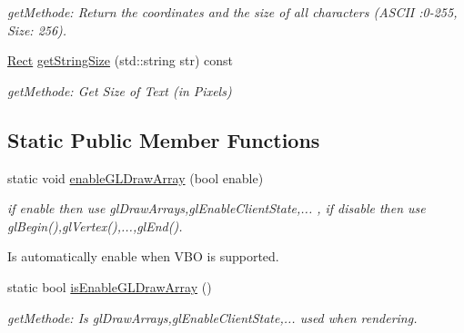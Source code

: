 \begin{DoxyCompactItemize}
\begin{DoxyCompactList}\small\item\em getMethode: Return the coordinates and the size of all characters (ASCII :0-\/255, Size: 256). \item\end{DoxyCompactList}\item 
\hyperlink{class_f2_c_1_1_rect}{Rect} \hyperlink{class_f2_c_1_1_font_sprite_af1955ebf33a251df746d2788dbf6a1d3}{getStringSize} (std::string str) const 
\begin{DoxyCompactList}\small\item\em getMethode: Get Size of Text (in Pixels) \item\end{DoxyCompactList}\end{DoxyCompactItemize}
\subsection*{Static Public Member Functions}
\begin{DoxyCompactItemize}
\item 
static void \hyperlink{class_f2_c_1_1_font_sprite_a6bfad10a42bad52511094add228ae235}{enableGLDrawArray} (bool enable)
\begin{DoxyCompactList}\small\item\em if enable then use glDrawArrays,glEnableClientState,... , if disable then use glBegin(),glVertex(),...,glEnd(). \par
 Is automatically enable when VBO is supported. \item\end{DoxyCompactList}\item 
\hypertarget{class_f2_c_1_1_font_sprite_a59dbe165faa3ebe5f6e565a88095ad82}{
static bool \hyperlink{class_f2_c_1_1_font_sprite_a59dbe165faa3ebe5f6e565a88095ad82}{isEnableGLDrawArray} ()}
\label{class_f2_c_1_1_font_sprite_a59dbe165faa3ebe5f6e565a88095ad82}

\begin{DoxyCompactList}\small\item\em getMethode: Is glDrawArrays,glEnableClientState,... used when rendering. \item\end{DoxyCompactList}\end{DoxyCompactItemize}
